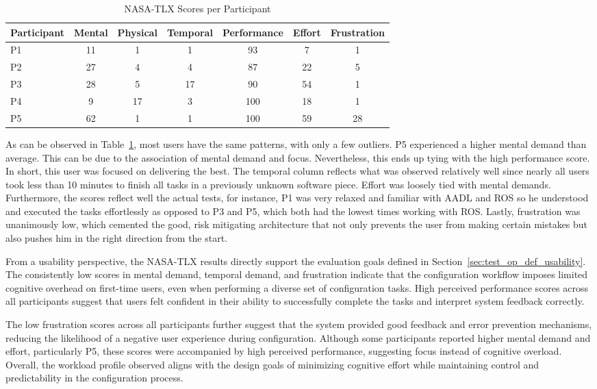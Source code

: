 \begin{table}[htbp]
	\centering
	\caption{NASA-\gls{TLX} Scores per Participant}
	\label{tab:nasatlx}
	\begin{tabular}{lcccccc}
		\toprule
		Participant & Mental & Physical & Temporal & Performance & Effort & Frustration \\
		\midrule
		P1 & 11 & 1 & 1 & 93 & 7 & 1 \\
		P2 & 27 & 4 & 4 & 87 & 22 & 5 \\
		P3 & 28 & 5 & 17 & 90 & 54 & 1 \\
		P4 & 9 & 17 & 3 & 100 & 18 & 1 \\
		P5 & 62 & 1 & 1 & 100 & 59 & 28 \\
		\bottomrule
	\end{tabular}
\end{table}

As can be observed in Table~\ref{tab:nasatlx}, most users have the same patterns, with only a few outliers. P5 experienced a higher mental demand than average. This can be due to the association of mental demand and focus. Nevertheless, this ends up tying with the high performance score. In short, this user was focused on delivering the best. The temporal column reflects what was observed relatively well since nearly all users took less than 10 minutes to finish all tasks in a previously unknown software piece. Effort was loosely tied with mental demands. Furthermore, the scores reflect well the actual tests, for instance, P1 was very relaxed and familiar with \gls{AADL} and \gls{ROS} so he understood and executed the tasks effortlessly as opposed to P3 and P5, which both had the lowest times working with \gls{ROS}. Lastly, frustration was unanimously low, which cemented the good, risk mitigating architecture that not only prevents the user from making certain mistakes but also pushes him in the right direction from the start.

From a usability perspective, the NASA-\gls{TLX} results directly support the evaluation goals defined in Section~\ref{sec:test_op_def_usability}. The consistently low scores in mental demand, temporal demand, and frustration indicate that the configuration workflow imposes limited cognitive overhead on first-time users, even when performing a diverse set of configuration tasks. High perceived performance scores across all participants suggest that users felt confident in their ability to successfully complete the tasks and interpret system feedback correctly.

The low frustration scores across all participants further suggest that the system provided good feedback and error prevention mechanisms, reducing the likelihood of a negative user experience during configuration. Although some participants reported higher mental demand and effort, particularly P5, these scores were accompanied by high perceived performance, suggesting focus instead of cognitive overload. Overall, the workload profile observed aligns with the design goals of minimizing cognitive effort while maintaining control and predictability in the configuration process.

